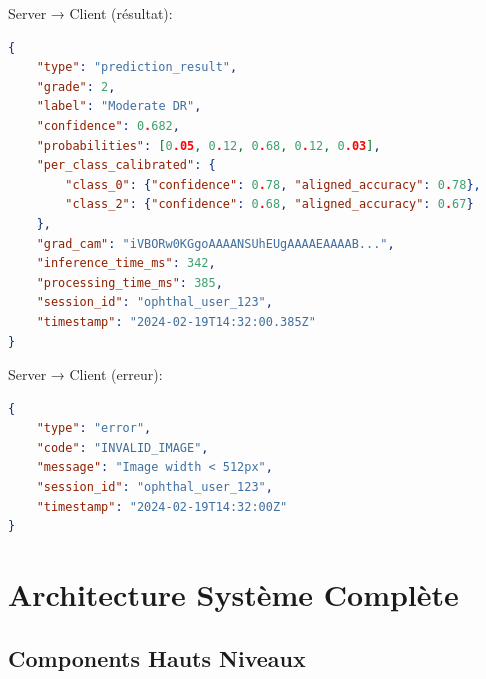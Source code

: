 \documentclass[12pt,a4paper,oneside]{report}
\begin{document}
Server → Client (résultat):

\begin{lstlisting}[language=json, caption=WebSocket 
message format (response)]
{
    "type": "prediction_result",
    "grade": 2,
    "label": "Moderate DR",
    "confidence": 0.682,
    "probabilities": [0.05, 0.12, 0.68, 0.12, 0.03],
    "per_class_calibrated": {
        "class_0": {"confidence": 0.78, "aligned_accuracy": 0.78},
        "class_2": {"confidence": 0.68, "aligned_accuracy": 0.67}
    },
    "grad_cam": "iVBORw0KGgoAAAANSUhEUgAAAAEAAAAB...",
    "inference_time_ms": 342,
    "processing_time_ms": 385,
    "session_id": "ophthal_user_123",
    "timestamp": "2024-02-19T14:32:00.385Z"
}
\end{lstlisting}

Server → Client (erreur):

\begin{lstlisting}[language=json, caption=WebSocket 
message format (error)]
{
    "type": "error",
    "code": "INVALID_IMAGE",
    "message": "Image width < 512px",
    "session_id": "ophthal_user_123",
    "timestamp": "2024-02-19T14:32:00Z"
}
\end{lstlisting}

\newpage


\chapter{Architecture Système Complète}

\section{Components Hauts Niveaux}
\end{document}
